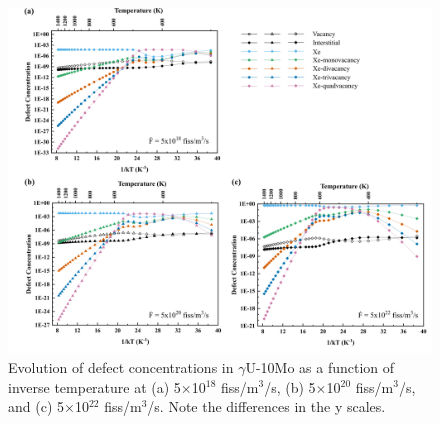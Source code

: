 \documentclass[preprint,12pt]{elsarticle}
\begin{document}
\begin{figure}[hbt!]
\centering
\includegraphics[width=1\textwidth]{Fig8.png}
\caption{Evolution of defect concentrations in $\gamma$U-10Mo as a function of inverse temperature at (a) 5$\times$10$^{18}$ fiss/m$^{3}$/s, (b) 5$\times$10$^{20}$ fiss/m$^{3}$/s, and (c) 5$\times$10$^{22}$ fiss/m$^{3}$/s. Note the differences in the y scales.}
\label{fig:Xecon}
\end{figure}

\FloatBarrier
\end{document}
